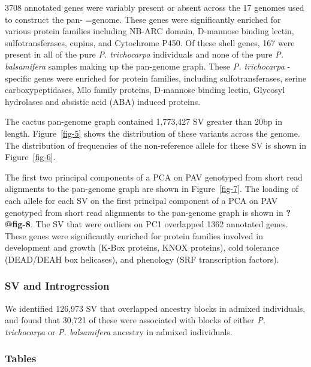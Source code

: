 \documentclass[
]{agujournal2019}
\begin{document}
3708 annotated genes were variably present or absent across the 17
genomes used to construct the pan- =genome. These genes were
significantly enriched for various protein families including NB-ARC
domain, D-mannose binding lectin, sulfotransferases, cupins, and
Cytochrome P450. Of these shell genes, 167 were present in all of the
pure \emph{P. trichocarpa} individuals and none of the pure \emph{P.
balsamifera} samples making up the pan-genome graph. These \emph{P.
trichocarpa} - specific genes were enriched for protein families,
including sulfotransferases, serine carboxypeptidases, Mlo family
proteins, D-mannose binding lectin, Glycosyl hydrolases and absistic
acid (ABA) induced proteins.

The cactus pan-genome graph contained 1,773,427 SV greater than 20bp in
length. Figure~\ref{fig-5} shows the distribution of these variants
across the genome. The distribution of frequencies of the non-reference
allele for these SV is shown in Figure~\ref{fig-6}.

The first two principal components of a PCA on PAV genotyped from short
read alignments to the pan-genome graph are shown in Figure~\ref{fig-7}.
The loading of each allele for each SV on the first principal component
of a PCA on PAV genotyped from short read alignments to the pan-genome
graph is shown in \textbf{?@fig-8}. The SV that were outliers on PC1
overlapped 1362 annotated genes. These genes were significantly enriched
for protein families involved in development and growth (K-Box proteins,
KNOX proteins), cold tolerance (DEAD/DEAH box helicases), and phenology
(SRF transcription factors).

\subsubsection{SV and Introgression}\label{sv-and-introgression}

We identified 126,973 SV that overlapped ancestry blocks in admixed
individuals, and found that 30,721 of these were associated with blocks
of either \emph{P. trichocarpa} or \emph{P. balsamifera} ancestry in
admixed individuals.

\subsubsection{Tables}\label{tables}
\end{document}
